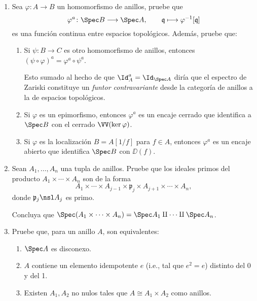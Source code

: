 \documentclass[11pt, reqno]{amsart}
\begin{document}
\begin{enumerate}
\begin{enumerate}[resume]
		\end{enumerate}
	\item Sea $\varphi \colon A \to B$ un homomorfismo de anillos, pruebe que
		\[
			\varphi^a \colon \Spec B \longrightarrow \Spec A, \qquad
			\mathfrak{q} \longmapsto \varphi^{-1}[\mathfrak{q}]
		\]
		es una función continua entre espacios topológicos.
		Además, pruebe que:
		\begin{enumerate}
			\item Si $\psi \colon B \to C$ es otro homomorfismo de anillos, entonces $(\psi\circ \varphi)^a
				= \varphi^a\circ \psi^a$.
				
				\lookup
				Esto sumado al hecho de que $\Id_A^a = \Id_{\Spec A}$ diría que el espectro de Zariski
				constituye un \emph{funtor contravariante} desde la categoría de anillos a la de
				espacios topológicos.
			\item Si $\varphi$ es un epimorfismo, entonces $\varphi^a$ es un encaje cerrado que identifica a
				$\Spec B$ con el cerrado $\VV(\ker\varphi)$.
			\item Si $\varphi$ es la localización $B = A[1/f]$ para $f \in A$, entonces $\varphi^a$ es un
				encaje abierto que identifica $\Spec B$ con $\DD(f)$.
		\end{enumerate}
	\item Sean $A_1, \dots, A_n$ una tupla de anillos.
		Pruebe que los ideales primos del producto $A_1 \times \cdots \times A_n$ son de la forma
		\[
			A_1 \times \cdots \times A_{j-1} \times \mathfrak{p}_j \times A_{j+1} \times \cdots \times A_n,
		\]
		donde $\mathfrak{p}_j \nsl A_j$ es primo.

		Concluya que $\Spec(A_1 \times \cdots \times A_n) = \Spec A_1 \amalg \cdots \amalg \Spec A_n$.
	\item Pruebe que, para un anillo $A$, son equivalentes:
		\begin{enumerate}
			\item $\Spec A$ es disconexo.
			\item $A$ contiene un elemento idempotente $e$ (i.e., tal que $e^2 = e$) distinto del 0 y del 1.
			\item Existen $A_1, A_2$ no nulos tales que $A \cong A_1 \times A_2$ como anillos.
		\end{enumerate}


\end{enumerate}
\end{document}
